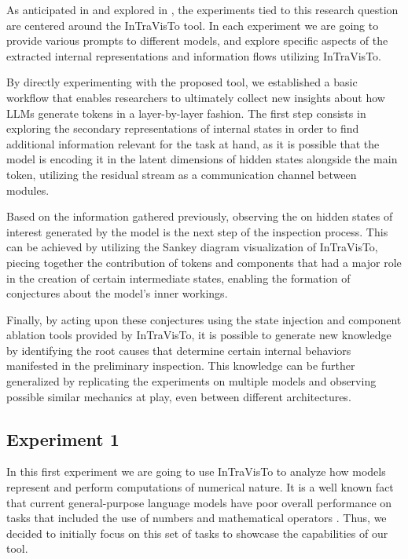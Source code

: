 As anticipated in  and explored in , the experiments tied to this research question are centered around the InTraVisTo tool.
In each experiment we are going to provide various prompts to different models, and explore specific aspects of the extracted internal representations and information flows utilizing InTraVisTo.

By directly experimenting with the proposed tool, we established a basic workflow that enables researchers to ultimately collect new insights about how LLMs generate tokens in a layer-by-layer fashion.  
The first step consists in exploring the secondary representations of internal states in order to find additional information relevant for the task at hand, as it is possible that the model is encoding it in the latent dimensions of hidden states alongside the main token, utilizing the residual stream as a communication channel between modules.

Based on the information gathered previously, observing the  on hidden states of interest generated by the model is the next step of the inspection process.
This can be achieved by utilizing the Sankey diagram visualization of InTraVisTo, piecing together the contribution of tokens and components that had a major role in the creation of certain intermediate states, enabling the formation of conjectures about the model's inner workings.

Finally, by acting upon these conjectures using the state injection and component ablation tools provided by InTraVisTo, it is possible to generate new knowledge by identifying the root causes that determine certain internal behaviors manifested in the preliminary inspection.
This knowledge can be further generalized by replicating the experiments on multiple models and observing possible similar mechanics at play, even between different architectures.

\subsection{Experiment 1}

In this first experiment we are going to use InTraVisTo to analyze how models represent and perform computations of numerical nature.
It is a well known fact that current general-purpose language models have  poor overall performance on tasks that included the use of numbers and mathematical operators .
Thus, we decided to initially focus on this set of tasks to showcase the  capabilities of our  tool.

